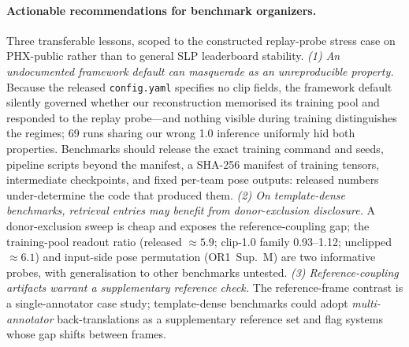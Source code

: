 \documentclass[pdflatex,sn-chicago]{sn-jnl}
\begin{document}
\paragraph{Actionable recommendations for benchmark organizers.}
Three transferable lessons, scoped to the constructed replay-probe stress case on PHX-public rather than to general SLP leaderboard stability. \emph{(1) An undocumented framework default can masquerade as an unreproducible property.} Because the released \texttt{config.yaml} specifies no clip fields, the framework default silently governed whether our reconstruction memorised its training pool and responded to the replay probe---and nothing visible during training distinguishes the regimes; 69 runs sharing our wrong 1.0 inference uniformly hid both properties. Benchmarks should release the exact training command and seeds, pipeline scripts beyond the manifest, a SHA-256 manifest of training tensors, intermediate checkpoints, and fixed per-team pose outputs: released numbers under-determine the code that produced them. \emph{(2) On template-dense benchmarks, retrieval entries may benefit from donor-exclusion disclosure.} A donor-exclusion sweep is cheap and exposes the reference-coupling gap; the training-pool readout ratio (released $\approx5.9$; clip-1.0 family 0.93--1.12; unclipped $\approx6.1$) and input-side pose permutation (OR1~Sup.~M) are two informative probes, with generalisation to other benchmarks untested. \emph{(3) Reference-coupling artifacts warrant a supplementary reference check.} The reference-frame contrast is a single-annotator case study; template-dense benchmarks could adopt \emph{multi-annotator} back-translations as a supplementary reference set and flag systems whose gap shifts between frames.
\end{document}
